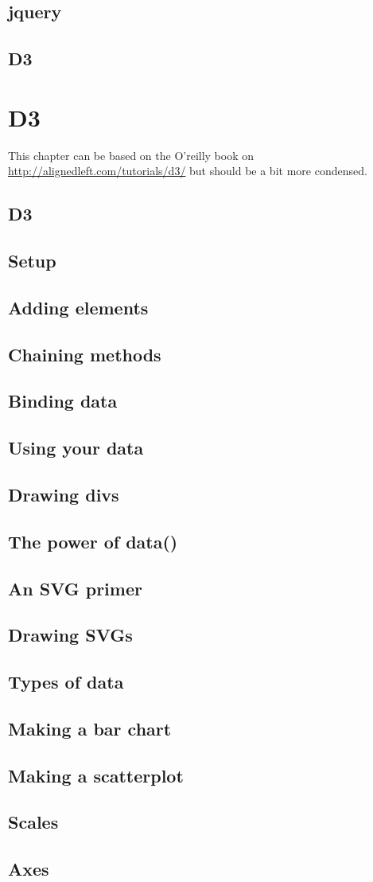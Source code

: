 \documentclass{book}
\begin{document}
    \section{jquery}
    \section{D3}

\chapter{D3}
This chapter can be based on the O'reilly book on \url{http://alignedleft.com/tutorials/d3/} 
but should be a bit more condensed.
    \section{D3}
    \section{Setup}
    \section{Adding elements}
    \section{Chaining methods}
    \section{Binding data}
    \section{Using your data}
    \section{Drawing divs}
    \section{The power of data()}
    \section{An SVG primer}
    \section{Drawing SVGs}
    \section{Types of data}
    \section{Making a bar chart}
    \section{Making a scatterplot}
    \section{Scales}
    \section{Axes}
\end{document}
